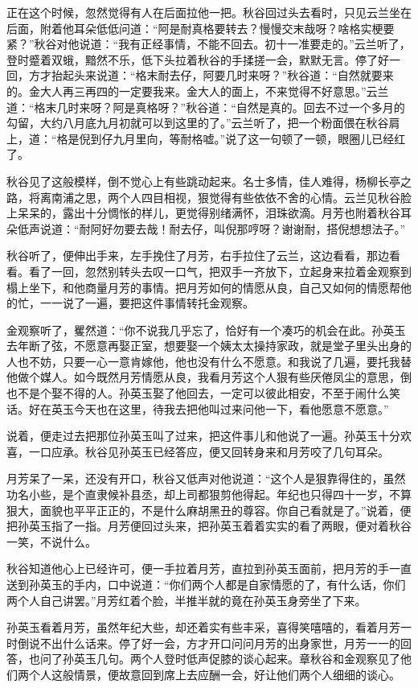\documentclass[12pt,UTF8]{ctexbook}
\begin{document}
{{{正在这个时候，忽然觉得有人在后面拉他一把。秋谷回过头去看时，只见云兰坐在后面，附着他耳朵低低问道：“阿是耐真格要转去？慢慢交末哉呀？啥格实梗要紧？”秋谷对他说道：“我有正经事情，不能不回去。初十一准要走的。”云兰听了，登时蹙着双蛾，黯然不乐，低下头拉着秋谷的手揉搓一会，默默无言。停了好一回，方才抬起头来说道：“格末耐去仔，阿要几时来呀？”秋谷道：“自然就要来的。金大人再三再四的一定要我来。金大人的面上，不来觉得不好意思。”云兰道：“格末几时来呀？阿是真格呀？”秋谷道：“自然是真的。回去不过一个多月的勾留，大约八月底九月初就可以到这里的了。”云兰听了，把一个粉面偎在秋谷肩上，道：“格是倪到仔九月里向，等耐格嘘。”说了这一句顿了一顿，眼圈儿已经红了。

秋谷见了这般模样，倒不觉心上有些跳动起来。名士多情，佳人难得，杨柳长亭之路，将离南浦之思，两个人四目相视，狠觉得有些依依不舍的心情。云兰见秋谷脸上呆呆的，露出十分惆怅的样儿，更觉得别绪满怀，泪珠欲滴。月芳也附着秋谷耳朵低声说道：“耐阿好勿要去哉！耐去仔，叫倪那哼呀？谢谢耐，搭倪想想法子。”

秋谷听了，便伸出手来，左手挽住了月芳，右手拉住了云兰，这边看看，那边看看。看了一回，忽然别转头去叹一口气，把双手一齐放下，立起身来拉着金观察到榻上坐下，和他商量月芳的事情。把月芳如何的情愿从良，自己又如何的情愿帮他的忙，一一说了一遍，要把这件事情转托金观察。

金观察听了，矍然道：“你不说我几乎忘了，恰好有一个凑巧的机会在此。孙英玉去年断了弦，不愿意再娶正室，想要娶一个姨太太操持家政，就是堂子里头出身的人也不妨，只要一心一意肯嫁他，他也没有什么不愿意。和我说了几遍，要托我替他做个媒人。如今既然月芳情愿从良，我看月芳这个人狠有些厌倦凤尘的意思，倒也不是个娶不得的人。孙英玉娶了他回去，一定可以彼此相安，不至于闹什么笑话。好在英玉今天也在这里，待我去把他叫过来问他一下，看他愿意不愿意。”

说着，便走过去把那位孙英玉叫了过来，把这件事儿和他说了一遍。孙英玉十分欢喜，一口应承。秋谷见孙英玉已经答应，便又回转身来和月芳咬了几句耳朵。

月芳呆了一呆，还没有开口，秋谷又低声对他说道：“这个人是狠靠得住的，虽然功名小些，是个直隶候补县丞，却上司都狠剪他得起。年纪也只得四十一岁，不算狠大，面貌也平平正正的，不是什么麻胡黑丑的尊容。你自己看就是了。”说着，便把孙英玉指了一指。月芳便回过头来，把孙英玉着着实实的看了两眼，便对着秋谷一笑，不说什么。

秋谷知道他心上已经许可，便一手拉着月芳，直拉到孙英玉面前，把月芳的手一直送到孙英玉的手内，口中说道：“你们两个人都是自家情愿的了，有什么话，你们两个人自己讲罢。”月芳红着个脸，半推半就的竟在孙英玉身旁坐了下来。

孙英玉看着月芳，虽然年纪大些，却还着实有些丰采，喜得笑嘻嘻的，看着月芳一时倒说不出什么话来。停了好一会，方才开口问问月芳的出身家世，月芳一一的回答，也问了孙英玉几句。两个人登时低声促膝的谈心起来。章秋谷和金观察见了他们两个人这般情景，便故意回到席上去应酬一会，好让他们两个人细细的谈心。

}}}
\end{document}
